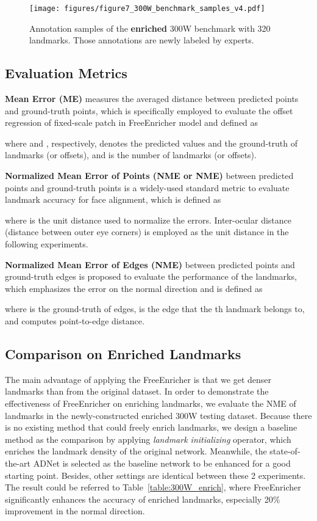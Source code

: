 \documentclass[letterpaper]{article} \usepackage{aaai23}  \usepackage{times}  \usepackage{helvet}  \usepackage{courier}  \usepackage[hyphens]{url}  \usepackage{graphicx} \urlstyle{rm} \def\UrlFont{\rm}  \usepackage{natbib}  \usepackage{caption} \frenchspacing  \setlength{\pdfpagewidth}{8.5in}  \setlength{\pdfpageheight}{11in}  \usepackage{algorithm}
\begin{document}
\begin{figure}\centering
\texttt{[image: figures/figure7\_300W\_benchmark\_samples\_v4.pdf]}
\caption{Annotation samples of the \textbf{enriched} 300W benchmark with 320 landmarks. Those annotations are newly labeled by experts.}
\label{figure:300W_benchmark_samples}
\end{figure}

\subsection{Evaluation Metrics}
\label{sec:experiment_metrics}

\noindent\textbf{Mean Error (ME)} measures the averaged  distance between predicted points and ground-truth points, which is specifically employed to evaluate the offset regression of fixed-scale patch in FreeEnricher model and defined as

where  and , respectively, denotes the predicted values and the ground-truth of landmarks (or offsets), and  is the number of landmarks (or offsets).

\vspace{5px}
\noindent\textbf{Normalized Mean Error of Points (NME or NME)} between predicted points and ground-truth points is a widely-used standard metric to evaluate landmark accuracy for face alignment, which is defined as

where  is the unit distance used to normalize the errors. Inter-ocular distance (distance between outer eye corners) is employed as the unit distance in the following experiments.

\vspace{5px}
\noindent\textbf{Normalized Mean Error of Edges (NME)} between predicted points and ground-truth edges is proposed to evaluate the performance of the landmarks, which emphasizes the error on the normal direction and is defined as

where  is the ground-truth of edges,  is the edge that the th landmark belongs to, and  computes point-to-edge distance.

\subsection{Comparison on Enriched Landmarks}
The main advantage of applying the FreeEnricher is that we get denser landmarks than from the original dataset.
In order to demonstrate the effectiveness of FreeEnricher on enriching landmarks, we evaluate the NME of landmarks in the newly-constructed enriched 300W testing dataset.
Because there is no existing method that could freely enrich landmarks, we design a baseline method as the comparison by applying \emph{landmark initializing} operator, which enriches the landmark density of the original network.
Meanwhile, the state-of-the-art ADNet is selected as the baseline network to be enhanced for a good starting point.
Besides, other settings are identical between these 2 experiments.
The result could be referred to Table~\ref{table:300W_enrich}, where FreeEnricher significantly enhances the accuracy of enriched landmarks, especially 20\% improvement in the normal direction. 
\end{document}
